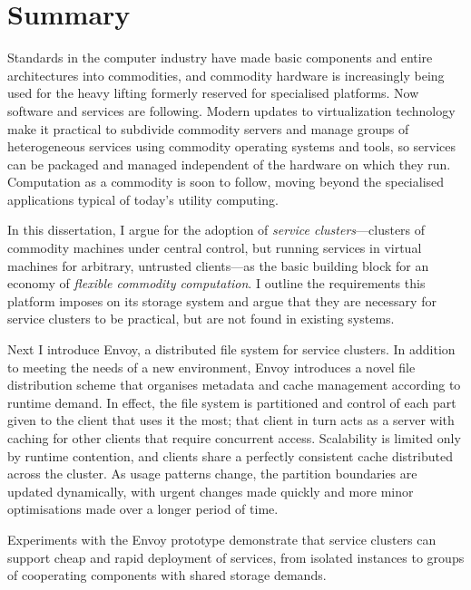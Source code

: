 

% 
% 
% 


\chapter*{Summary}


\noindent Standards in the computer industry have made basic components and entire architectures into commodities, and commodity hardware is increasingly being used for the heavy lifting formerly reserved for specialised platforms. Now software and services are following. Modern updates to virtualization technology make it practical to subdivide commodity servers and manage groups of heterogeneous services using commodity operating systems and tools, so services can be packaged and managed independent of the hardware on which they run. Computation as a commodity is soon to follow, moving beyond the specialised applications typical of today's utility computing.

In this dissertation, I argue for the adoption of \emph{service clusters}---clusters of commodity machines under central control, but running services in virtual machines for arbitrary, untrusted clients---as the basic building block for an economy of \emph{flexible commodity computation}. I outline the requirements this platform imposes on its storage system and argue that they are necessary for service clusters to be practical, but are not found in existing systems.

Next I introduce Envoy, a distributed file system for service clusters. In addition to meeting the needs of a new environment, Envoy introduces a novel file distribution scheme that organises metadata and cache management according to runtime demand. In effect, the file system is partitioned and control of each part given to the client that uses it the most; that client in turn acts as a server with caching for other clients that require concurrent access. Scalability is limited only by runtime contention, and clients share a perfectly consistent cache distributed across the cluster. As usage patterns change, the partition boundaries are updated dynamically, with urgent changes made quickly and more minor optimisations made over a longer period of time.

Experiments with the Envoy prototype demonstrate that service clusters can support cheap and rapid deployment of services, from isolated instances to groups of cooperating components with shared storage demands.
